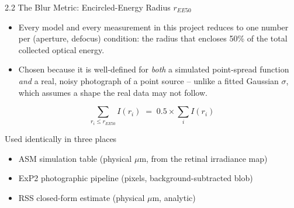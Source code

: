 \documentclass[aspectratio=169]{beamer}
\begin{document}
\begin{frame}{2.2 The Blur Metric: Encircled-Energy Radius $r_{EE50}$}
  \begin{itemize}
    \item Every model and every measurement in this project reduces to one
      number per (aperture, defocus) condition: the radius that encloses 50\%
      of the total collected optical energy.
    \item Chosen because it is well-defined for \emph{both} a simulated
      point-spread function \emph{and} a real, noisy photograph of a point
      source -- unlike a fitted Gaussian $\sigma$, which assumes a shape the
      real data may not follow.
  \end{itemize}
  \[
    \sum_{r_i \leq r_{EE50}} I(r_i) \;=\; 0.5 \times \sum_{i} I(r_i)
  \]
  \begin{block}{Used identically in three places}
    \begin{itemize}
      \item ASM simulation table (physical $\mu$m, from the retinal irradiance map)
      \item ExP2 photographic pipeline (pixels, background-subtracted blob)
      \item RSS closed-form estimate (physical $\mu$m, analytic)
    \end{itemize}
  \end{block}
\end{frame}
\end{document}
